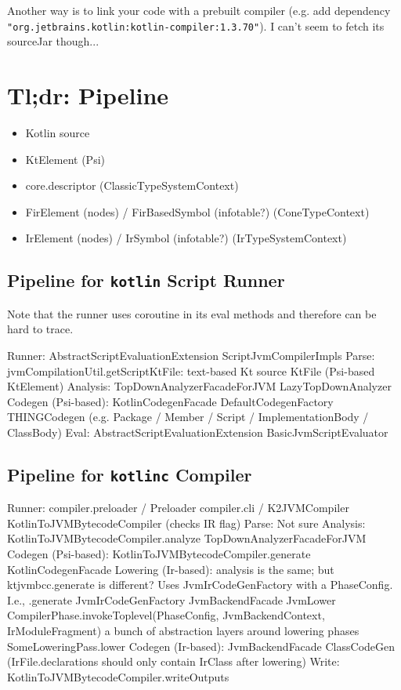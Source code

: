 \documentclass{article}
\begin{document}
Another way is to link your code with a prebuilt compiler (e.g. add dependency \texttt{"org.jetbrains.kotlin:kotlin-compiler:1.3.70"}). I can't seem to fetch its sourceJar though...

\section{Tl;dr: Pipeline}
\begin{itemize}
    \item Kotlin source
    \item KtElement (Psi)
    \item core.descriptor (ClassicTypeSystemContext)
    \item FirElement (nodes) / FirBasedSymbol (infotable?) (ConeTypeContext)
    \item IrElement (nodes) / IrSymbol (infotable?) (IrTypeSystemContext)
\end{itemize}


\subsection{Pipeline for \texttt{kotlin} Script Runner}
Note that the runner uses coroutine in its eval methods and therefore can be hard to trace.

Runner: AbstractScriptEvaluationExtension \textSafeTo ScriptJvmCompilerImpls
Parse: jvmCompilationUtil.getScriptKtFile: text-based Kt source \textSafeTo KtFile (Psi-based KtElement)
Analysis: TopDownAnalyzerFacadeForJVM \textSafeTo LazyTopDownAnalyzer
Codegen (Psi-based): KotlinCodegenFacade \textSafeTo DefaultCodegenFactory \textSafeTo THINGCodegen (e.g. Package / Member / Script / ImplementationBody / ClassBody)
Eval: AbstractScriptEvaluationExtension \textSafeTo BasicJvmScriptEvaluator

\subsection{Pipeline for \texttt{kotlinc} Compiler}

 Runner: compiler.preloader / Preloader \textSafeTo compiler.cli / K2JVMCompiler \textSafeTo KotlinToJVMBytecodeCompiler (checks IR flag)
Parse: Not sure
Analysis: KotlinToJVMBytecodeCompiler.analyze \textSafeTo TopDownAnalyzerFacadeForJVM
Codegen (Psi-based): KotlinToJVMBytecodeCompiler.generate \textSafeTo KotlinCodegenFacade
Lowering (Ir-based): analysis is the same; but ktjvmbcc.generate is different? Uses JvmIrCodeGenFactory with a PhaseConfig. I.e., .generate \textSafeTo JvmIrCodeGenFactory \textSafeTo JvmBackendFacade \textSafeTo JvmLower \textSafeTo CompilerPhase.invokeToplevel(PhaseConfig, JvmBackendContext, IrModuleFragment) \textSafeTo a bunch of abstraction layers around lowering phases \textSafeTo SomeLoweringPass.lower
Codegen (Ir-based): JvmBackendFacade \textSafeTo ClassCodeGen (IrFile.declarations should only contain IrClass after lowering)
Write: KotlinToJVMBytecodeCompiler.writeOutputs
\end{document}
